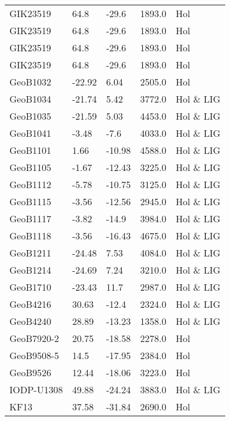 \begin{longtable}{lllrl}
         GIK23519 &     64.8 &     -29.6 &     1893.0 &         Hol \\
         GIK23519 &     64.8 &     -29.6 &     1893.0 &         Hol \\
         GIK23519 &     64.8 &     -29.6 &     1893.0 &         Hol \\
         GIK23519 &     64.8 &     -29.6 &     1893.0 &         Hol \\
         GeoB1032 &   -22.92 &      6.04 &     2505.0 &         Hol \\
         GeoB1034 &   -21.74 &      5.42 &     3772.0 &   Hol \& LIG \\
         GeoB1035 &   -21.59 &      5.03 &     4453.0 &   Hol \& LIG \\
         GeoB1041 &    -3.48 &      -7.6 &     4033.0 &   Hol \& LIG \\
         GeoB1101 &     1.66 &    -10.98 &     4588.0 &   Hol \& LIG \\
         GeoB1105 &    -1.67 &    -12.43 &     3225.0 &   Hol \& LIG \\
         GeoB1112 &    -5.78 &    -10.75 &     3125.0 &   Hol \& LIG \\
         GeoB1115 &    -3.56 &    -12.56 &     2945.0 &   Hol \& LIG \\
         GeoB1117 &    -3.82 &     -14.9 &     3984.0 &   Hol \& LIG \\
         GeoB1118 &    -3.56 &    -16.43 &     4675.0 &   Hol \& LIG \\
         GeoB1211 &   -24.48 &      7.53 &     4084.0 &   Hol \& LIG \\
         GeoB1214 &   -24.69 &      7.24 &     3210.0 &   Hol \& LIG \\
         GeoB1710 &   -23.43 &      11.7 &     2987.0 &   Hol \& LIG \\
         GeoB4216 &    30.63 &     -12.4 &     2324.0 &   Hol \& LIG \\
         GeoB4240 &    28.89 &    -13.23 &     1358.0 &   Hol \& LIG \\
       GeoB7920-2 &    20.75 &    -18.58 &     2278.0 &         Hol \\
       GeoB9508-5 &     14.5 &    -17.95 &     2384.0 &         Hol \\
         GeoB9526 &    12.44 &    -18.06 &     3223.0 &         Hol \\
       IODP-U1308 &    49.88 &    -24.24 &     3883.0 &   Hol \& LIG \\
             KF13 &    37.58 &    -31.84 &     2690.0 &         Hol \\

\end{longtable}
